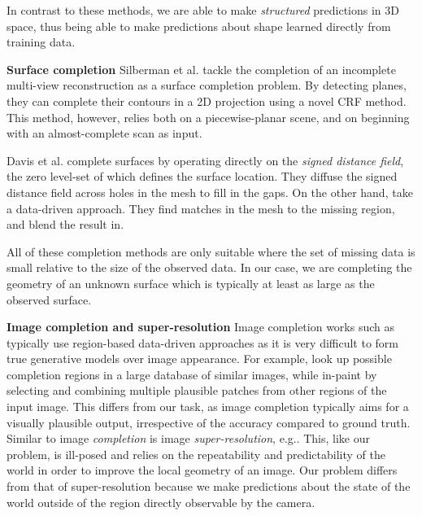 \documentclass[10pt,twocolumn,letterpaper]{article}
\makeatletter
\renewcommand*{\eg}{e.g.\@\xspace}
\newcommand*{\ea}{et al.\@\xspace}
\renewcommand{\paragraph}{\vspace{2pt}\noindent\textbf}
\makeatother
\begin{document}
In contrast to these methods, we are able to make \emph{structured} predictions in 3D space, thus being able to make predictions about shape learned directly from training data.


\paragraph{Surface completion}
Silberman \ea \cite{silberman-eccv-2014} tackle the completion of an incomplete multi-view reconstruction as a surface completion problem.
By detecting planes, they can complete their contours in a 2D projection using a novel CRF method.
This method, however, relies both on a piecewise-planar scene, and on beginning with an almost-complete scan as input.

Davis \ea \cite{davis-3dpvt-2002} complete surfaces by operating directly on the \emph{signed distance field}, the zero level-set of which defines the surface location. They diffuse the signed distance field across holes in the mesh to fill in the gaps.
On the other hand, \cite{harary-tog-2013} take a data-driven approach.
They find matches in the mesh to the missing region, and blend the result in.

All of these completion methods are only suitable where the set of missing data is small relative to the size of the observed data.
In our case, we are completing the geometry of an unknown surface which is typically at least as large as the observed surface.


\paragraph{Image completion and super-resolution}
Image completion works such as \cite{hays-siggraph-2007, criminisi-cvpr-2003}
typically use region-based data-driven approaches as it is very difficult to form true generative models over image appearance.
For example, \cite{hays-siggraph-2007} look up possible completion regions in a large database of similar images, while \cite{criminisi-cvpr-2003} in-paint by selecting and combining multiple plausible patches from other regions of the input image.
This differs from our task, as image completion typically aims for a visually plausible output, irrespective of the accuracy compared to ground truth.
Similar to image \emph{completion} is image \emph{super-resolution}, \eg \cite{macaodha-eccv-2012}. 
This, like our problem, is ill-posed and relies on the repeatability and predictability of the world in order to improve the local geometry of an image.
Our problem differs from that of super-resolution because we make predictions about the state of the world outside of the region directly observable by the camera.
\end{document}

